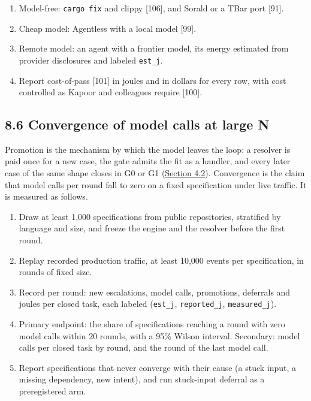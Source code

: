 \documentclass[10pt,letterpaper]{article}
\providecommand{\tightlist}{\setlength{\itemsep}{1pt}\setlength{\parskip}{0pt}}
\begin{document}
\begin{enumerate}
\def\labelenumi{\arabic{enumi}.}
\tightlist
\item
  Model-free: \texttt{cargo\ fix} and clippy {[}106{]}, and Sorald or a
  TBar port {[}91{]}.
\item
  Cheap model: Agentless with a local model {[}99{]}.
\item
  Remote model: an agent with a frontier model, its energy estimated
  from provider disclosures and labeled \texttt{est\_j}.
\item
  Report cost-of-pass {[}101{]} in joules and in dollars for every row,
  with cost controlled as Kapoor and colleagues require {[}100{]}.
\end{enumerate}

\subsection{8.6 Convergence of model calls at large
N}\label{convergence-of-model-calls-at-large-n}

Promotion is the mechanism by which the model leaves the loop: a
resolver is paid once for a new case, the gate admits the fit as a
handler, and every later case of the same shape closes in G0 or G1
(\href{https://research.openie.dev/papers/rce/\#42-the-gears}{Section
4.2}). Convergence is the claim that model calls per round fall to zero
on a fixed specification under live traffic. It is measured as follows.

\begin{enumerate}
\def\labelenumi{\arabic{enumi}.}
\tightlist
\item
  Draw at least 1,000 specifications from public repositories,
  stratified by language and size, and freeze the engine and the
  resolver before the first round.
\item
  Replay recorded production traffic, at least 10,000 events per
  specification, in rounds of fixed size.
\item
  Record per round: new escalations, model calls, promotions, deferrals
  and joules per closed task, each labeled (\texttt{est\_j},
  \texttt{reported\_j}, \texttt{measured\_j}).
\item
  Primary endpoint: the share of specifications reaching a round with
  zero model calls within 20 rounds, with a 95\% Wilson interval.
  Secondary: model calls per closed task by round, and the round of the
  last model call.
\item
  Report specifications that never converge with their cause (a stuck
  input, a missing dependency, new intent), and run stuck-input deferral
  as a preregistered arm.
\end{enumerate}
\end{document}
